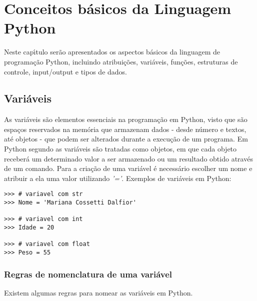 
\chapter{Conceitos b\'{a}sicos da Linguagem Python}
Neste cap\'{\i}tulo ser\~{a}o apresentados os aspectos b\'{a}sicos da linguagem de programa\c{c}\~{a}o Python, incluindo atribui\c{c}\~{o}es, vari\'{a}veis, fun\c{c}\~{o}es, estruturas de controle, input/output e tipos de dados.

	\section{Vari\'{a}veis}
As vari\'{a}veis s\~{a}o elementos essenciais na programa\c{c}\~{a}o em Python, visto que s\~{a}o espa\c{c}os reservados na mem\'{o}ria que armazenam dados - desde n\'{u}mero e textos, at\'{e} objetos - que podem ser alterados durante a execu\c{c}\~{a}o de um programa. Em Python segundo \cite{Sousa2020} as vari\'{a}veis s\~{a}o tratadas como objetos, em que cada objeto receber\'{a} um determinado valor a ser armazenado ou um resultado obtido atrav\'{e}s de um comando. Para a cria\c{c}\~{a}o de uma vari\'{a}vel \'{e} necess\'{a}rio escolher um nome e atribuir a ela uma valor utilizando \textsl{'='}. Exemplos de vari\'{a}veis em Python: 
	
\begin{lstlisting}
>>> # variavel com str
>>> Nome = 'Mariana Cossetti Dalfior'

>>> # variavel com int
>>> Idade = 20

>>> # variavel com float
>>> Peso = 55
\end{lstlisting}

		\subsection{Regras de nomenclatura de uma vari\'{a}vel}
Existem algumas regras para nomear as vari\'{a}veis em Python. 

